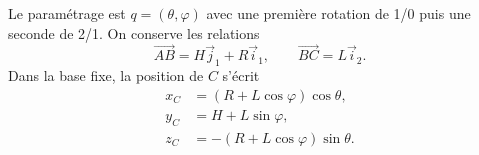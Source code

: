 \begin{corrigebox}
Le paramétrage est $q=(\theta,\varphi)$ avec une première rotation de 1/0
puis une seconde de 2/1. On conserve les relations
\[\overrightarrow{AB}=H\vec j_1+R\vec i_1,\qquad
  \overrightarrow{BC}=L\vec i_2.\]
Dans la base fixe, la position de $C$ s'écrit
\[
\begin{aligned}
x_C&=(R+L\cos\varphi)\cos\theta,\\
y_C&=H+L\sin\varphi,\\
z_C&=-(R+L\cos\varphi)\sin\theta.
\end{aligned}
\]
\end{corrigebox}
